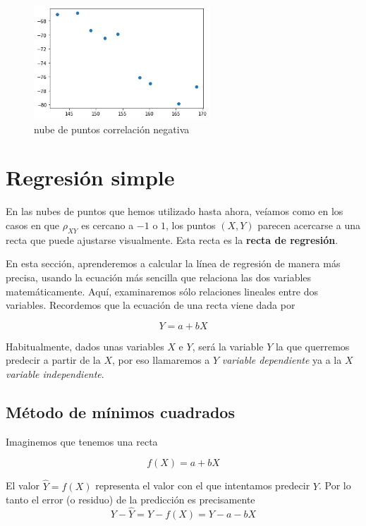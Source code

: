 \documentclass[
]{article}
\begin{document}
\begin{itemize}
  \begin{figure}
  \centering
  \includegraphics[width=2.60417in,height=\textheight]{cloud_menos.png}
  \caption{nube de puntos correlación negativa}
  \end{figure}
\end{itemize}

\hypertarget{regresiuxf3n-simple}{%
\section{Regresión simple}\label{regresiuxf3n-simple}}

En las nubes de puntos que hemos utilizado hasta ahora, veíamos como en
los casos en que \(\rho_{XY}\) es cercano a \(-1\) o \(1\), los puntos
\((X,Y)\) parecen acercarse a una recta que puede ajustarse visualmente.
Esta recta es la \textbf{recta de regresión}.

En esta sección, aprenderemos a calcular la línea de regresión de manera
más precisa, usando la ecuación más sencilla que relaciona las dos
variables matemáticamente. Aquí, examinaremos sólo relaciones lineales
entre dos variables. Recordemos que la ecuación de una recta viene dada
por

\[Y= a + b X \]

Habitualmente, dados unas variables \(X\) e \(Y\), será la variable
\(Y\) la que querremos predecir a partir de la \(X\), por eso llamaremos
a \(Y\) \emph{variable dependiente} ya a la \(X\) \emph{variable
independiente}.

\hypertarget{muxe9todo-de-muxednimos-cuadrados}{%
\subsection{Método de mínimos
cuadrados}\label{muxe9todo-de-muxednimos-cuadrados}}

Imaginemos que tenemos una recta

\[f(X)= a + b X\]

El valor \(\hat Y = f(X)\) representa el valor con el que intentamos
predecir \(Y\). Por lo tanto el error (o residuo) de la predicción es
precisamente \[Y- \hat Y = Y - f(X) = Y- a - b X\]
\end{document}
